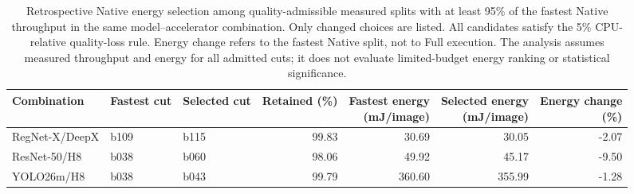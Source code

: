 \begin{table}[t]
\centering\small
\setlength{\tabcolsep}{3pt}
\caption{Retrospective Native energy selection among quality-admissible measured splits with at least 95\% of the fastest Native throughput in the same model--accelerator combination. Only changed choices are listed. All candidates satisfy the 5\% CPU-relative quality-loss rule. Energy change refers to the fastest Native split, not to Full execution. The analysis assumes measured throughput and energy for all admitted cuts; it does not evaluate limited-budget energy ranking or statistical significance.}
\label{tab:energy-floor-95}
\begin{tabular*}{\textwidth}{@{\extracolsep{\fill}}lllrrrr@{}}
\toprule
Combination & Fastest cut & Selected cut & Retained (\%) & \shortstack{Fastest energy\\(mJ/image)} & \shortstack{Selected energy\\(mJ/image)} & \shortstack{Energy change\\(\%)} \\
\midrule
RegNet-X/DeepX & b109 & b115 & 99.83 & 30.69 & 30.05 & -2.07 \\
ResNet-50/H8 & b038 & b060 & 98.06 & 49.92 & 45.17 & -9.50 \\
YOLO26m/H8 & b038 & b043 & 99.79 & 360.60 & 355.99 & -1.28 \\
\bottomrule
\end{tabular*}
\end{table}
